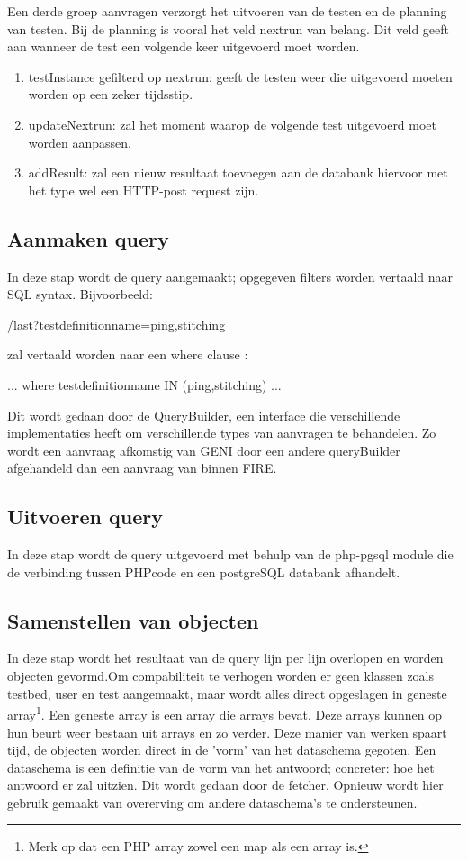 \clearpage
Een derde groep aanvragen verzorgt het uitvoeren van de testen en de planning van testen. Bij de planning is vooral het veld nextrun van belang. Dit veld geeft aan wanneer de test een volgende keer uitgevoerd moet worden.
\begin{enumerate}
\item testInstance gefilterd op nextrun: geeft de testen weer die uitgevoerd moeten worden op een zeker tijdsstip.
\item updateNextrun: zal het moment waarop de volgende test uitgevoerd moet worden aanpassen.
\item addResult: zal een nieuw resultaat toevoegen aan de databank hiervoor met het type wel een HTTP-post request zijn.
\end{enumerate}

\subsection{Aanmaken query}
\npar 
In deze stap wordt de query aangemaakt; opgegeven filters worden vertaald naar SQL syntax. Bijvoorbeeld:
\begin{lt}
/last?testdefinitionname=ping,stitching
\end{lt}
zal vertaald worden naar een where clause :
\begin{lt}
... where testdefinitionname IN (ping,stitching) ...
\end{lt}
\npar
Dit wordt gedaan door de QueryBuilder, een interface die verschillende implementaties heeft om verschillende types van aanvragen te behandelen. Zo wordt een aanvraag afkomstig van GENI door een andere queryBuilder afgehandeld dan een aanvraag van binnen FIRE.

\subsection{Uitvoeren query}
\npar
In deze stap wordt de query uitgevoerd met behulp van de php-pgsql module die de verbinding tussen PHPcode en een postgreSQL databank afhandelt.
\clearpage
\subsection{Samenstellen van objecten}
\npar
In deze stap wordt het resultaat van de query lijn per lijn overlopen en worden objecten gevormd.Om compabiliteit te verhogen worden er geen klassen zoals testbed, user en test aangemaakt, maar wordt alles direct opgeslagen in geneste array\footnote{Merk op dat een PHP array zowel een map als een array is.}. Een geneste array is een array die arrays bevat. Deze arrays kunnen op hun beurt weer bestaan uit arrays en zo verder. 
\npar
Deze manier van werken spaart tijd, de objecten worden direct in de 'vorm' van het dataschema gegoten. Een dataschema is een definitie van de vorm van het antwoord; concreter: hoe het antwoord er zal uitzien. Dit wordt gedaan door de fetcher. Opnieuw wordt hier gebruik gemaakt van overerving om andere dataschema's te ondersteunen.

